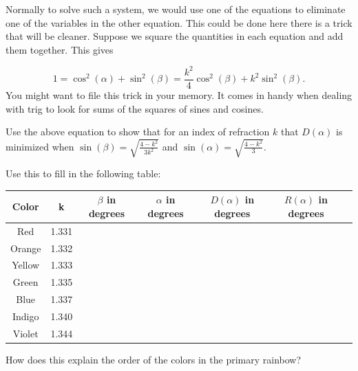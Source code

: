 Normally to solve such a system, we would use one of the equations to
eliminate one of the variables in the other equation.  This could be
done here there is a trick that will be cleaner.  Suppose we square
the quantities in each equation and add them together. This gives

$$
1=\cos^2(\alpha)+\sin^2(\beta)=\frac{k^2}{4}\cos^2(\beta)+k^2\sin^2(\beta).
$$
You might want to file this trick in your memory.  It comes in handy
when dealing with trig to look for sums of the squares of sines and
cosines.


\begin{embeddedproblem-enumerate}
  \begin{enumerate}[label={\bf{}(\alph*)}]
    \item Use the above equation to show that for an index of
      refraction $k$ that $D(\alpha)$  is minimized when
      $\sin(\beta)=\sqrt{\frac{4-k^2}{3k^2}}$ and
      $\sin(\alpha)=\sqrt{\frac{4-k^2}{3}}$.
  \item Use this to fill in the following table:
        \begin{table}[h]
          \begin{center}
            \begin{tabular}{|c|c|c|c|c|c|c|} \hline Color& k& $\beta$
              in degrees&$\alpha$ in degrees&$D(\alpha)$ in
              degrees&$R(\alpha)$ in degrees\\\hline Red & 1.331 &
              &&&\\\hline Orange & 1.332 & &&&\\\hline Yellow & 1.333
              & &&&\\\hline Green & 1.335 & &&&\\\hline Blue & 1.337 &
              &&&\\\hline Indigo & 1.340 & &&&\\\hline Violet & 1.344
              & &&&\\\hline
            \end{tabular}
          \end{center}
    \item  How does  this  explain the order of the colors in the
      primary rainbow?
    \end{table}

  \end{enumerate}
\end{embeddedproblem-enumerate}

